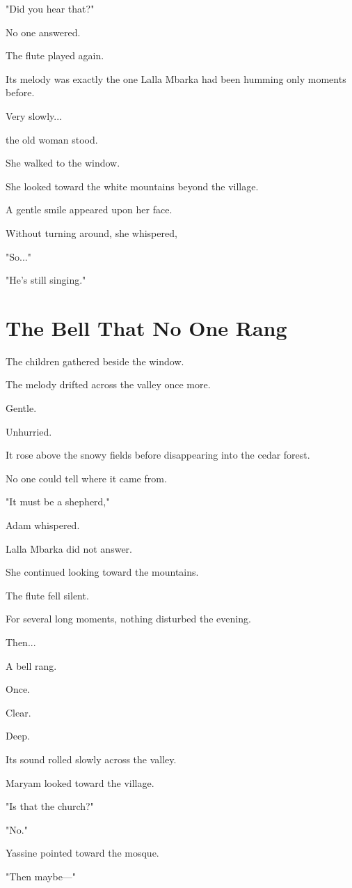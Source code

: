 \documentclass[12pt,openany]{book}
\begin{document}
"Did you hear that?"

No one answered.

The flute played again.

Its melody was exactly the one Lalla Mbarka had been humming only moments before.

Very slowly...

the old woman stood.

She walked to the window.

She looked toward the white mountains beyond the village.

A gentle smile appeared upon her face.

Without turning around, she whispered,

"So..."

"He's still singing."
\section*{The Bell That No One Rang}

The children gathered beside the window.

The melody drifted across the valley once more.

Gentle.

Unhurried.

It rose above the snowy fields before disappearing into the cedar forest.

No one could tell where it came from.

"It must be a shepherd,"

Adam whispered.

Lalla Mbarka did not answer.

She continued looking toward the mountains.

The flute fell silent.

For several long moments, nothing disturbed the evening.

Then...

A bell rang.

Once.

Clear.

Deep.

Its sound rolled slowly across the valley.

Maryam looked toward the village.

"Is that the church?"

"No."

Yassine pointed toward the mosque.

"Then maybe—"
\end{document}
